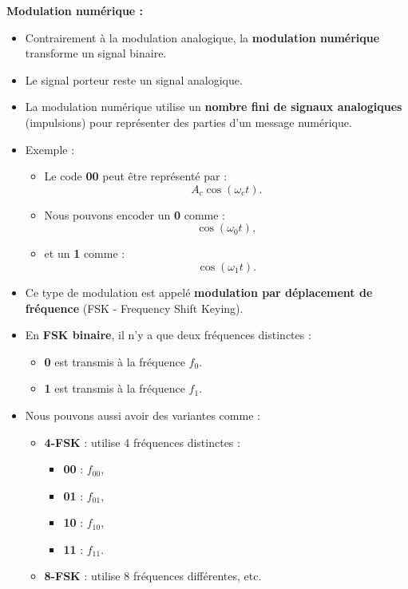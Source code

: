 \textbf{Modulation numérique :}

\begin{itemize}
    \item Contrairement à la modulation analogique, la \textbf{modulation numérique} transforme un signal binaire.
    \item Le signal porteur reste un signal analogique.
    \item La modulation numérique utilise un \textbf{nombre fini de signaux analogiques} (impulsions) pour représenter des parties d'un message numérique.
    \item Exemple :
    \begin{itemize}
        \item Le code \textbf{00} peut être représenté par : 
        \[
        A_c \cos(\omega_c t).
        \]
        \item Nous pouvons encoder un \textbf{0} comme :
        \[
        \cos(\omega_0 t),
        \]
        \item et un \textbf{1} comme :
        \[
        \cos(\omega_1 t).
        \]
    \end{itemize}
    \item Ce type de modulation est appelé \textbf{modulation par déplacement de fréquence} (FSK - Frequency Shift Keying).
    \item En \textbf{FSK binaire}, il n'y a que deux fréquences distinctes :
    \begin{itemize}
        \item \textbf{0} est transmis à la fréquence $f_0$.
        \item \textbf{1} est transmis à la fréquence $f_1$.
    \end{itemize}
    \item Nous pouvons aussi avoir des variantes comme :
    \begin{itemize}
        \item \textbf{4-FSK} : utilise 4 fréquences distinctes :
        \begin{itemize}
            \item \textbf{00} : $f_{00}$,
            \item \textbf{01} : $f_{01}$,
            \item \textbf{10} : $f_{10}$,
            \item \textbf{11} : $f_{11}$.
        \end{itemize}
        \item \textbf{8-FSK} : utilise 8 fréquences différentes, etc.
    \end{itemize}
\end{itemize}

